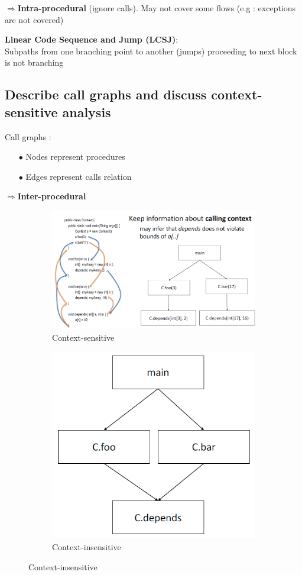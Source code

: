 \documentclass{article}
\begin{document}
\noindent $\Rightarrow$\textbf{Intra-procedural} (ignore calls). May not cover some flows (e.g : exceptions are not covered)
\vspace{3em}

\noindent\textbf{Linear Code Sequence and Jump (LCSJ)}:\\
Subpaths from
one
branching
point
to
another
(jumps)
proceeding
to
next
block
is
not
branching

\newpage
\subsection{Describe call graphs and discuss context-sensitive analysis}
\noindent Call graphs : 
\begin{itemize}
    \item [$\bullet$]Nodes represent procedures
    \item [$\bullet$]Edges represent calls relation\\
\end{itemize}
\noindent $\Rightarrow$\textbf{Inter-procedural} 

\begin{figure}[h!]
\centering
\begin{subfigure}{.5\textwidth}
  \centering
        \includegraphics[width=1\linewidth]{image/5.PNG}
  \caption{Context-sensitive}
  \label{fig:sub1}
\end{subfigure}%
\begin{subfigure}{.5\textwidth}
  \centering
        \includegraphics[width=0.5\linewidth]{image/6.PNG}
  \caption{Context-insensitive}
  \label{fig:sub2}
\end{subfigure}
\label{fig:test}
\end{figure}
\end{document}
